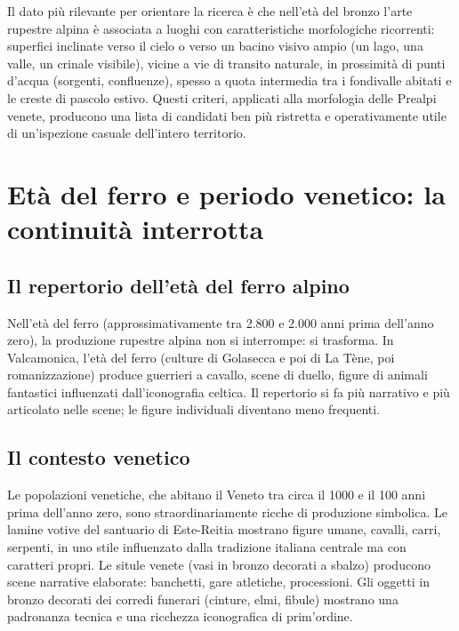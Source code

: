 Il dato più rilevante per orientare la ricerca è che nell'età del bronzo l'arte rupestre alpina è associata a luoghi con caratteristiche morfologiche ricorrenti: superfici inclinate verso il cielo o verso un bacino visivo ampio (un lago, una valle, un crinale visibile), vicine a vie di transito naturale, in prossimità di punti d'acqua (sorgenti, confluenze), spesso a quota intermedia tra i fondivalle abitati e le creste di pascolo estivo. Questi criteri, applicati alla morfologia delle Prealpi venete, producono una lista di candidati ben più ristretta e operativamente utile di un'ispezione casuale dell'intero territorio.

\section{Età del ferro e periodo venetico: la continuità interrotta}

\subsection{Il repertorio dell'età del ferro alpino}

Nell'età del ferro (approssimativamente tra 2.800 e 2.000 anni prima dell'anno zero), la produzione rupestre alpina non si interrompe: si trasforma. In Valcamonica, l'età del ferro (culture di Golasecca e poi di La Tène, poi romanizzazione) produce guerrieri a cavallo, scene di duello, figure di animali fantastici influenzati dall'iconografia celtica. Il repertorio si fa più narrativo e più articolato nelle scene; le figure individuali diventano meno frequenti.

\subsection{Il contesto venetico}

Le popolazioni venetiche, che abitano il Veneto tra circa il 1000 e il 100 anni prima dell'anno zero, sono straordinariamente ricche di produzione simbolica. Le lamine votive del santuario di Este-Reitia mostrano figure umane, cavalli, carri, serpenti, in uno stile influenzato dalla tradizione italiana centrale ma con caratteri propri. Le situle venete (vasi in bronzo decorati a sbalzo) producono scene narrative elaborate: banchetti, gare atletiche, processioni. Gli oggetti in bronzo decorati dei corredi funerari (cinture, elmi, fibule) mostrano una padronanza tecnica e una ricchezza iconografica di prim'ordine.


